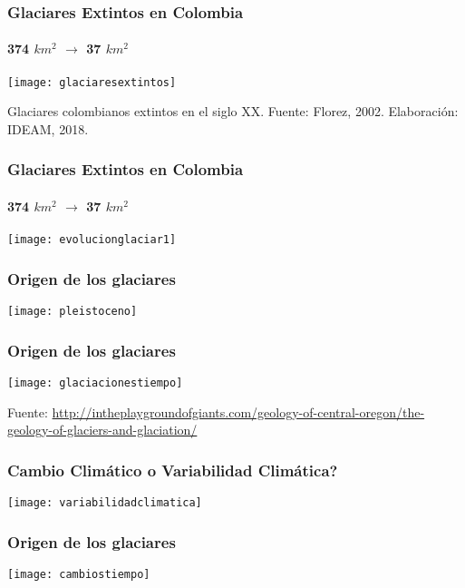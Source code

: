 \documentclass{beamer}
\begin{document}
\begin{frame}
\frametitle{Glaciares Extintos en Colombia}
\framesubtitle{374 $km^2$ $\rightarrow$ 37 $km^2$}
\begin{center}
\texttt{[image: glaciaresextintos]}
\end{center}
\tiny{Glaciares colombianos extintos en el siglo XX. Fuente: Florez, 2002. Elaboración: IDEAM, 2018.}
\end{frame}
\begin{frame}
\frametitle{Glaciares Extintos en Colombia}
\framesubtitle{374 $km^2$ $\rightarrow$ 37 $km^2$}
\begin{center}
\texttt{[image: evolucionglaciar1]}
\end{center}
\end{frame}
\begin{frame}
\frametitle{Origen de los glaciares}
\begin{center}
\texttt{[image: pleistoceno]}
\end{center}
\end{frame}
\begin{frame}
\frametitle{Origen de los glaciares}
\begin{center}
\texttt{[image: glaciacionestiempo]}
\end{center}
\tiny{Fuente: \url{http://intheplaygroundofgiants.com/geology-of-central-oregon/the-geology-of-glaciers-and-glaciation/}}
\end{frame}
\begin{frame}
\frametitle{Cambio Climático o Variabilidad Climática?}
\begin{center}
\texttt{[image: variabilidadclimatica]}
\end{center}
\end{frame}
\begin{frame}
\frametitle{Origen de los glaciares}
\begin{center}
\texttt{[image: cambiostiempo]}
\end{center}
\end{frame}
\end{document}
